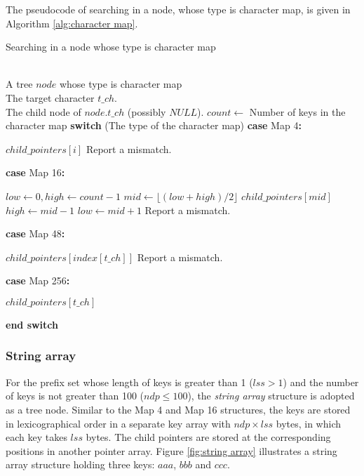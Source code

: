 \documentclass{article}
\makeatletter
\newcommand{\SWITCH}[1]{\STATE \textbf{switch} (#1)}
\newcommand{\ENDPWITCH}{\STATE \textbf{end switch}}
\newcommand{\CASE}[1]{\STATE \textbf{case} #1\textbf{:} \begin{ALC@g}}
\newcommand{\ENDCASE}{\end{ALC@g}}
\makeatother
\begin{document}
The pseudocode of searching in a node, whose type is character map, is
given in Algorithm \ref{alg:character map}.

\begin{algorithm}
  \caption{Searching in a node whose type is character map}\scriptsize
  \label{alg:character map}
  \begin{algorithmic}[1]
    \REQUIRE ~~\\
    A tree $node$ whose type is character map\\
    The target character $t\_ch$.
    \ENSURE ~~\\
    The child node of $node.t\_ch$ (possibly $NULL$).
    \STATE
    \STATE $count \leftarrow$ Number of keys in the character map
    \STATE
    \SWITCH{The type of the character map}
    \CASE{\textsf{Map 4}}
    \RETURN $child\_pointers[i]$
    \ENDIF
    \ENDFOR
    \STATE Report a mismatch.
    \ENDCASE
    \STATE
    \CASE{\textsf{Map 16}}
    \STATE $low \leftarrow 0, high \leftarrow count-1$
    \STATE $mid \leftarrow \lfloor (low+high)/2 \rfloor$
    \RETURN $child\_pointers[mid]$
    \STATE $high \leftarrow mid-1$
    \ELSE
    \STATE $low \leftarrow mid+1$
    \ENDIF
    \ENDWHILE
    \STATE Report a mismatch.
    \ENDCASE
    \STATE
    \CASE{\textsf{Map 48}}
    \RETURN $child\_pointers[index[t\_ch]]$
    \ELSE
    \STATE Report a mismatch.
    \ENDIF
    \ENDCASE
    \STATE
    \CASE{\textsf{Map 256}}
    \RETURN $child\_pointers[t\_ch]$
    \ENDCASE
    \ENDPWITCH
  \end{algorithmic}
\end{algorithm}

\subsubsection{String array}
\label{sec:string array}

For the prefix set whose length of keys is greater than 1 ($lss > 1$)
and the number of keys is not greater than 100 ($ndp \leq 100$), the
\emph{string array} structure is adopted as a tree node. Similar to
the Map 4 and Map 16 structures, the keys are stored in
lexicographical order in a separate key array with $ndp \times lss$
bytes, in which each key takes $lss$ bytes. The child pointers are
stored at the corresponding positions in another pointer array. Figure
\ref{fig:string array} illustrates a string array structure holding
three keys: $aaa$, $bbb$ and $ccc$.
\end{document}
